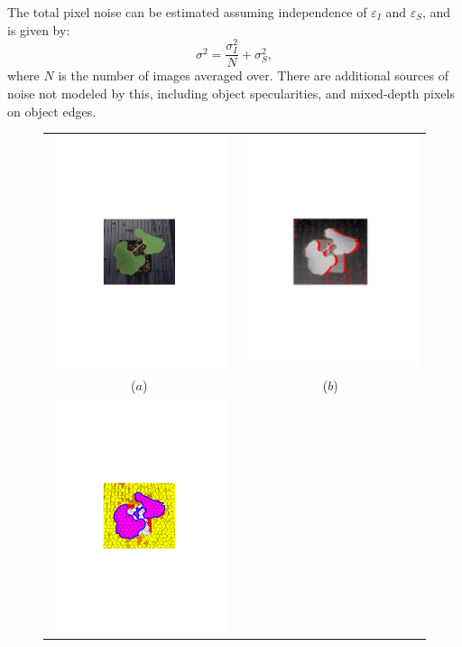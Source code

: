 The total pixel noise can be estimated assuming independence of $\varepsilon_I$ and $\varepsilon_S$, and is given by:
\begin{equation}
\sigma^2 = \frac{\sigma_I^2}{N} + \sigma_S^2,\label{eq:sigma}
\end{equation}
where $N$ is the number of images averaged over.  There are additional sources of noise not modeled by this, including object specularities, and mixed-depth pixels on object edges.  

\begin{figure}
\begin{center}
\begin{tabular}{cc}
\includegraphics[trim=190 280 190 290,clip,width=0.47\linewidth]{Figures/beanColor} &
\includegraphics[trim=190 280 190 290,clip,width=0.47\linewidth]{Figures/beanDepth} \\
($a$) & ($b$) \\
\includegraphics[trim=190 280 190 290,clip,width=0.47\linewidth]{Figures/slic_cropped2} &

\end{tabular}
\end{center}
\end{figure}
